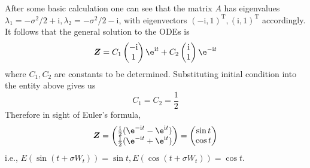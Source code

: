     \newcommand{\img}{\mathrm i}
    After some basic calculation one can see that the matrix $A$ has eigenvalues
    $\lambda_1=-\sigma^2/2+\img,\lambda_2=-\sigma^2/2-\img$, with eigenvectors $(-\img,1)^\mathrm T,(\img,1)^\mathrm T$
    accordingly. It follows that the general solution to the ODEs is
    \[\X=C_1\begin{pmatrix}
        -\img\\
        1
    \end{pmatrix}\e^{\img t}
    +C_2\begin{pmatrix}
        \img\\
        1
    \end{pmatrix}\e^{-\img t}\]
    where $C_1,C_2$ are constants to be determined.
    Substituting initial condition into the entity above gives us
    \[C_1=C_2=\frac{1}{2}\]
    Therefore in sight of Euler's formula,
    \[\X=\begin{pmatrix}
        \frac{\img}{2}(\e^{-\img t}-\e^{\img t})\\
        \frac{1}{2}(\e^{-\img t}+\e^{\img t})
    \end{pmatrix}
    =\begin{pmatrix}
        \sin t\\
        \cos t
    \end{pmatrix}\]
    i.e., $E(\sin(t+\sigma W_t))=\sin t,E(\cos(t+\sigma W_t))=\cos t$.

